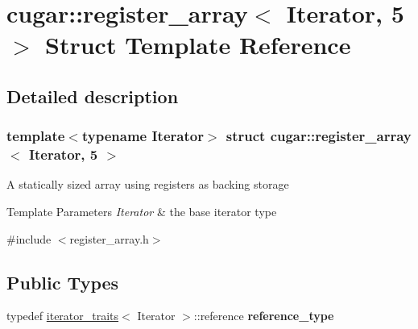 \hypertarget{structcugar_1_1register__array_3_01_iterator_00_015_01_4}{}\section{cugar\+:\+:register\+\_\+array$<$ Iterator, 5 $>$ Struct Template Reference}
\label{structcugar_1_1register__array_3_01_iterator_00_015_01_4}


\subsection{Detailed description}
\subsubsection*{template$<$typename Iterator$>$\newline
struct cugar\+::register\+\_\+array$<$ Iterator, 5 $>$}

A statically sized array using registers as backing storage


\begin{DoxyTemplParams}{Template Parameters}
{\em Iterator} & the base iterator type \\
\hline
\end{DoxyTemplParams}


{\ttfamily \#include $<$register\+\_\+array.\+h$>$}

\subsection*{Public Types}
\begin{DoxyCompactItemize}
\item 
\mbox{\label{structcugar_1_1register__array_3_01_iterator_00_015_01_4_a7d481dbf842c543def4486be62deb715}} 
typedef \hyperlink{structcugar_1_1iterator__traits}{iterator\+\_\+traits}$<$ Iterator $>$\+::reference {\bfseries reference\+\_\+type}
\end{DoxyCompactItemize}

